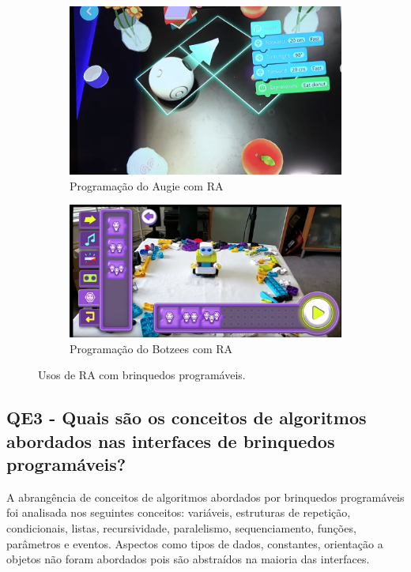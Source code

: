 \begin{figure}[!htbp]
    \centering
    \begin{subfigure}{.44\textwidth}
        \centering
        \includegraphics[width=.9\linewidth,fbox]{figs/augie_ar_programming_2.png}
        \caption{Programação do Augie com RA}
        \label{augie_ar_programming}
    \end{subfigure}%
    \begin{subfigure}{.55\textwidth}
        \centering
        \includegraphics[width=.9\linewidth,fbox]{figs/botzees.png}
        \caption{Programação do Botzees com RA}
        \label{botzees_ar_programming}
    \end{subfigure}
    \caption{Usos de RA com brinquedos programáveis.}
    \label{ar_programming}
\end{figure}

\subsection{QE3 - Quais são os conceitos de algoritmos abordados nas interfaces de brinquedos programáveis?}

A abrangência de conceitos de algoritmos abordados por brinquedos programáveis foi analisada nos seguintes conceitos: variáveis, estruturas de repetição, condicionais, listas, recursividade, paralelismo, sequenciamento, funções, parâmetros e eventos. Aspectos como tipos de dados, constantes, orientação a objetos não foram abordados pois são abstraídos na maioria das interfaces.

